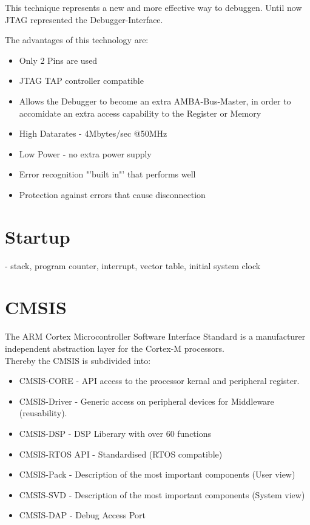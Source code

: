 This technique represents a new and more effective way to debuggen. Until now JTAG 
represented the Debugger-Interface.  


The advantages of this technology are:

\begin{itemize}
\item Only 2 Pins are used
\item JTAG TAP controller compatible
\item Allows the Debugger to become an extra AMBA-Bus-Master, in order to accomidate an extra 
access capability to the Register or Memory
\item High Datarates - 4Mbytes/sec @50MHz
\item Low Power - no extra power supply 
\item Error recognition "'built in"' that performs well
\item Protection against errors that cause disconnection
\end{itemize}  

\section{Startup}
 - stack, program counter, interrupt, vector table, initial system clock

\section{CMSIS}
The ARM Cortex Microcontroller Software Interface Standard is a manufacturer independent 
abstraction layer for the Cortex-M processors.\\
Thereby the CMSIS is subdivided into:
\begin{itemize}
\item CMSIS-CORE - API access to the processor kernal and peripheral register.
\item CMSIS-Driver - Generic access on peripheral devices for Middleware
			(reusability).
\item CMSIS-DSP - DSP Liberary with over 60 functions
\item CMSIS-RTOS API - Standardised (RTOS compatible)
\item CMSIS-Pack - Description of the most important components (User view)
\item CMSIS-SVD - Description of the most important components (System view)
\item CMSIS-DAP - Debug Access Port
\end{itemize}

